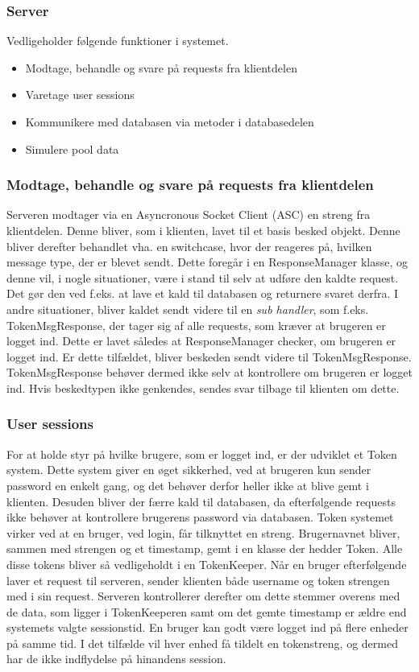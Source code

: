 \subsubsection{Server}

Vedligeholder følgende funktioner i systemet.

\begin{itemize}
	\item Modtage, behandle og svare på requests fra klientdelen
	\item Varetage user sessions
	\item Kommunikere med databasen via metoder i databasedelen
	\item Simulere pool data
\end{itemize}

\subsubsection{Modtage, behandle og svare på requests fra klientdelen}
Serveren modtager via en Asyncronous Socket Client (ASC) en streng fra klientdelen. Denne bliver, som i klienten, lavet til et basis besked objekt. Denne bliver derefter behandlet vha. en switchcase, hvor der reageres på, hvilken message type, der er blevet sendt. Dette foregår i en ResponseManager klasse, og denne vil, i nogle situationer, være i stand til selv at udføre den kaldte request. Det gør den ved f.eks. at lave et kald til databasen og returnere svaret derfra.
I andre situationer, bliver kaldet sendt videre til en \textit{sub handler}, som f.eks. TokenMsgResponse, der tager sig af alle requests, som kræver at brugeren er logget ind. Dette er lavet således at ResponseManager checker, om brugeren er logget ind. Er dette tilfældet, bliver beskeden sendt videre til TokenMsgResponse. TokenMsgResponse behøver dermed ikke selv at kontrollere om brugeren er logget ind.
Hvis beskedtypen ikke genkendes, sendes svar tilbage til klienten om dette.

\subsubsection{User sessions}
For at holde styr på hvilke brugere, som er logget ind, er der udviklet et Token system. Dette system giver en øget sikkerhed, ved at brugeren kun sender password en enkelt gang, og det behøver derfor heller ikke at blive gemt i klienten. Desuden bliver der færre kald til databasen, da efterfølgende requests ikke behøver at kontrollere brugerens password via databasen.
Token systemet virker ved at en bruger, ved login, får tilknyttet en streng. Brugernavnet bliver, sammen med strengen og et timestamp, gemt i en klasse der hedder Token. Alle disse tokens bliver så vedligeholdt i en TokenKeeper. Når en bruger efterfølgende laver et request til serveren, sender klienten både username og token strengen med i sin request. Serveren kontrollerer derefter om dette stemmer overens med de data, som ligger i TokenKeeperen samt om det gemte timestamp er ældre end systemets valgte sessionstid.
En bruger kan godt være logget ind på flere enheder på samme tid. I det tilfælde vil hver enhed få tildelt en tokenstreng, og dermed har de ikke indflydelse på hinandens session.

